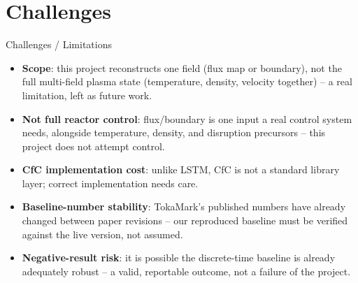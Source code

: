 \documentclass[aspectratio=169]{beamer}
\begin{document}
\section{Challenges}
\begin{frame}{Challenges / Limitations}
  \begin{itemize}
    \item \textbf{Scope}: this project reconstructs one field (flux map or
      boundary), not the full multi-field plasma state (temperature,
      density, velocity together) -- a real limitation, left as future work.
    \item \textbf{Not full reactor control}: flux/boundary is one input a
      real control system needs, alongside temperature, density, and
      disruption precursors -- this project does not attempt control.
    \item \textbf{CfC implementation cost}: unlike LSTM, CfC is not a
      standard library layer; correct implementation needs care.
    \item \textbf{Baseline-number stability}: TokaMark's published numbers
      have already changed between paper revisions -- our reproduced
      baseline must be verified against the live version, not assumed.
    \item \textbf{Negative-result risk}: it is possible the discrete-time
      baseline is already adequately robust -- a valid, reportable outcome,
      not a failure of the project.
  \end{itemize}
\end{frame}

\end{document}
